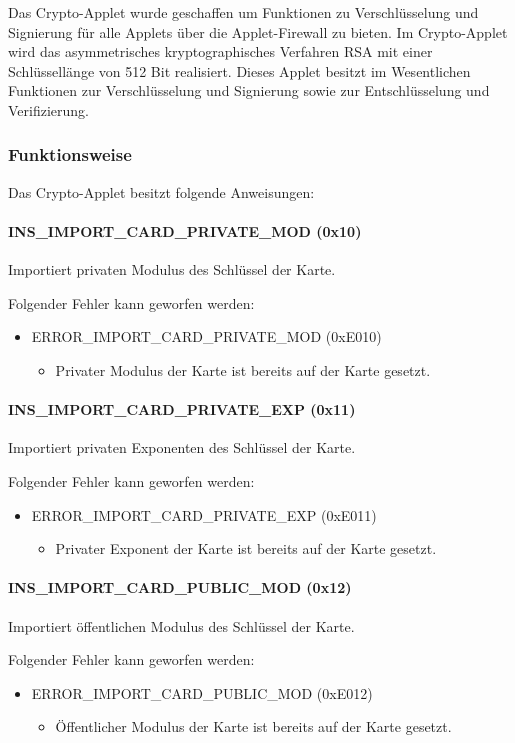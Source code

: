 Das Crypto-Applet wurde geschaffen um Funktionen zu Verschlüsselung und Signierung für alle Applets über die Applet-Firewall zu bieten.
Im Crypto-Applet wird das asymmetrisches kryptographisches Verfahren RSA mit einer Schlüssellänge von 512 Bit realisiert.
Dieses Applet besitzt im Wesentlichen Funktionen zur Verschlüsselung und Signierung sowie zur Entschlüsselung und Verifizierung.

\subsubsection{Funktionsweise}
Das Crypto-Applet besitzt folgende Anweisungen:
\paragraph{INS\_IMPORT\_CARD\_PRIVATE\_MOD (0x10)} Importiert privaten Modulus des Schlüssel der Karte.

Folgender Fehler kann geworfen werden:
\begin{itemize}
	\item ERROR\_IMPORT\_CARD\_PRIVATE\_MOD (0xE010)
	\begin{itemize}
		\item Privater Modulus der Karte ist bereits auf der Karte gesetzt.
	\end{itemize}
\end{itemize}
\paragraph{INS\_IMPORT\_CARD\_PRIVATE\_EXP (0x11)} Importiert privaten Exponenten des Schlüssel der Karte.

Folgender Fehler kann geworfen werden:
\begin{itemize}
	\item ERROR\_IMPORT\_CARD\_PRIVATE\_EXP (0xE011)
	\begin{itemize}
		\item Privater Exponent der Karte ist bereits auf der Karte gesetzt.
	\end{itemize}
\end{itemize}
\paragraph{INS\_IMPORT\_CARD\_PUBLIC\_MOD (0x12)} Importiert öffentlichen Modulus des Schlüssel der Karte.

Folgender Fehler kann geworfen werden:
\begin{itemize}
	\item ERROR\_IMPORT\_CARD\_PUBLIC\_MOD (0xE012)
	\begin{itemize}
		\item Öffentlicher Modulus der Karte ist bereits auf der Karte gesetzt.
	\end{itemize}
\end{itemize}
